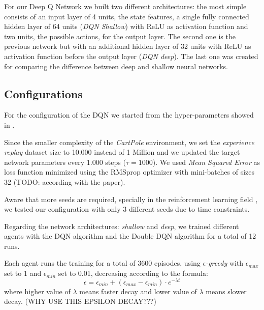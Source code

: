 For our Deep Q Network we built two different architectures: the most simple consists of an input layer of 4 units, the state features, a single fully connected hidden layer of 64 units (\textit{DQN Shallow}) with ReLU as activation function and two units, the possible actions, for the output layer. The second one is the previous network but with an additional hidden layer of 32 units with ReLU as activation function before the output layer (\textit{DQN deep}). %
The last one was created for comparing the difference between deep and shallow neural networks.

\subsection{Configurations}

For the configuration of the DQN we started from the hyper-parameters showed in \cite{Hasselt:2016:DRL:3016100.3016191}.

Since the smaller complexity of the \textit{CartPole} environment, we set the \textit{experience replay} dataset size  to 10.000 instead of 1 Million and we updated the target network parameters every 1.000 steps ($\tau = 1000$). We used \textit{Mean Squared Error} as loss function minimized using the RMSprop optimizer with mini-batches of sizes 32 (TODO: according with the paper).

Aware that more seeds are required, specially in the reinforcement learning field \cite{DBLP:journals/corr/abs-1709-06560}, we tested our configuration with only 3 different seeds due to time constraints.

Regarding the network architectures: \textit{shallow} and \textit{deep}, we trained different agents with the DQN algorithm \cite{Mnih2015} and the Double DQN algorithm \cite{Hasselt:2016:DRL:3016100.3016191} for a total of 12 runs.

Each agent runs the training for a total of 3600 episodes, using \textit{$\epsilon$-greedy} with $\epsilon_{max}$ set to 1 and $\epsilon_{min}$ set to 0.01, decreasing according to the formula: 
\begin{equation}
	\epsilon = \epsilon_{min} + (\epsilon_{max} - \epsilon_{min}) \cdot e^{- \lambda t}
\end{equation}
 where higher value of $\lambda$ means faster decay and lower value of $\lambda$ means slower decay.
(WHY USE THIS EPSILON DECAY???)

